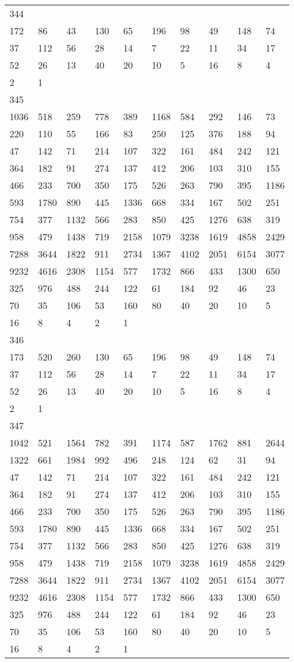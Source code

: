 \begin{longtable}{*{10}{l}}
344&&&&&&&&&\\
172& 86& 43& 130& 65& 196& 98& 49& 148& 74\\
37& 112& 56& 28& 14& 7& 22& 11& 34& 17\\
52& 26& 13& 40& 20& 10& 5& 16& 8& 4\\
2& 1& \\

345&&&&&&&&&\\
1036& 518& 259& 778& 389& 1168& 584& 292& 146& 73\\
220& 110& 55& 166& 83& 250& 125& 376& 188& 94\\
47& 142& 71& 214& 107& 322& 161& 484& 242& 121\\
364& 182& 91& 274& 137& 412& 206& 103& 310& 155\\
466& 233& 700& 350& 175& 526& 263& 790& 395& 1186\\
593& 1780& 890& 445& 1336& 668& 334& 167& 502& 251\\
754& 377& 1132& 566& 283& 850& 425& 1276& 638& 319\\
958& 479& 1438& 719& 2158& 1079& 3238& 1619& 4858& 2429\\
7288& 3644& 1822& 911& 2734& 1367& 4102& 2051& 6154& 3077\\
9232& 4616& 2308& 1154& 577& 1732& 866& 433& 1300& 650\\
325& 976& 488& 244& 122& 61& 184& 92& 46& 23\\
70& 35& 106& 53& 160& 80& 40& 20& 10& 5\\
16& 8& 4& 2& 1& \\

346&&&&&&&&&\\
173& 520& 260& 130& 65& 196& 98& 49& 148& 74\\
37& 112& 56& 28& 14& 7& 22& 11& 34& 17\\
52& 26& 13& 40& 20& 10& 5& 16& 8& 4\\
2& 1& \\

347&&&&&&&&&\\
1042& 521& 1564& 782& 391& 1174& 587& 1762& 881& 2644\\
1322& 661& 1984& 992& 496& 248& 124& 62& 31& 94\\
47& 142& 71& 214& 107& 322& 161& 484& 242& 121\\
364& 182& 91& 274& 137& 412& 206& 103& 310& 155\\
466& 233& 700& 350& 175& 526& 263& 790& 395& 1186\\
593& 1780& 890& 445& 1336& 668& 334& 167& 502& 251\\
754& 377& 1132& 566& 283& 850& 425& 1276& 638& 319\\
958& 479& 1438& 719& 2158& 1079& 3238& 1619& 4858& 2429\\
7288& 3644& 1822& 911& 2734& 1367& 4102& 2051& 6154& 3077\\
9232& 4616& 2308& 1154& 577& 1732& 866& 433& 1300& 650\\
325& 976& 488& 244& 122& 61& 184& 92& 46& 23\\
70& 35& 106& 53& 160& 80& 40& 20& 10& 5\\
16& 8& 4& 2& 1& \\


\end{longtable}
